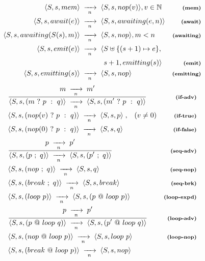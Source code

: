 \documentclass{acm_proc_article-sp}
\newcommand{\ST}{\1\xrightarrow[~n~]{}\1}
\newcommand{\LL}{\langle}
\newcommand{\RR}{\rangle}
\newcommand{\DS}{\displaystyle}
\newcommand{\rr}[1] {{\textbf{\scriptsize{#1}}}}
\newcommand{\1}{\;}
\newcommand{\2}{\;\;}
\newcommand{\3}{\;\;\;}
\newcommand{\5}{\;\;\;\;\;}
\begin{document}
\begin{figure}
%
{ \setlength{\jot}{7pt}
\begin{align*}
\LL S,s, mem \RR &\ST
\LL S,s, nop(v) \RR, v \in \mathbb{N}
    & \rr{(mem)}        \\
\LL S,s, await(e) \RR &\ST
\LL S,s, awaiting(e,n) \RR
    & \rr{(await)}      \\
\LL S,s, awaiting(S(s),m) \RR &\ST
\LL S,s, nop \RR, m<n
    & \rr{(awaiting)}   \\
\LL S,s, emit(e) \RR &\ST
\LL S \uplus \{(s+1) \mapsto e\}, \\
&~~~~~~~~~~s+1, emitting(s) \RR
    & \rr{(emit)}       \\
\LL S,s, emitting(s) \RR &\ST
\LL S,s, nop \RR
    & \rr{(emitting)}
\end{align*}
}
%
{ %
\begin{eqnarray*}
& \frac
    {\DS m \ST m' }
    {\DS \LL S,s, (m~?~p~:~q) \RR \ST
         \LL S,s, (m'~?~p~:~q)\RR }
    & \rr{(if-adv)}       \\
& \LL S,s, (nop(v)~?~p~:~q) \RR \ST
  \LL S,s,  p \RR \1,\3 (v \neq 0)
    & \rr{(if-true)}       \\
& \LL S,s, (nop(0)~?~p~:~q) \RR \ST
  \LL S,s, q \RR
    & \rr{(if-false)}       \\
& \frac
    {\DS p \ST p' }
    {\DS \LL S,s, (p~;~q) \RR \ST \LL S,s, (p'~;~q) \RR }
    & \rr{(seq-adv)}      \\
& \LL S,s, (nop~;~q) \RR \ST  \LL S,s, q \RR
    & \rr{(seq-nop)}      \\
& \LL S,s, (break~;~q) \RR \ST \LL S,s, break \RR
    & \rr{(seq-brk)}      \\
%
& \LL S,s, (loop~p) \RR \ST \LL S,s, (p~@~loop~p) \RR
    & \rr{(loop-expd)}       \\
& \frac
    {\DS p \ST p' }
    {\DS \LL S,s, (p~@~loop~q) \RR \ST \LL S,s, (p'~@~loop~q) \RR }
    & \rr{(loop-adv)}    \\
& \LL S,s, (nop~@~loop~p) \RR \ST \LL S,s, loop~p \RR
    & \rr{(loop-nop)}    \\
& \LL S,s, (break~@~loop~p) \RR \ST \LL S,s, nop \RR

\end{eqnarray*}}
\end{figure}
\end{document}
